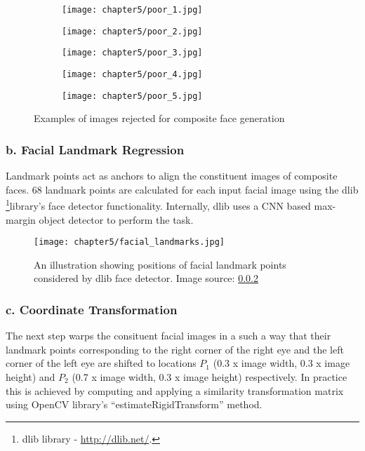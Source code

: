 \documentclass[../report.tex]{subfiles}
\begin{document}
       \begin{figure}[H]\label{fig_gmdb_poor}
    	   	\centering
    	   	\begin{subfigure}[b]{0.17\textwidth}
    		   		\centering
    		   		\texttt{[image: chapter5/poor\_1.jpg]}
    		   	\end{subfigure}
    	   	\begin{subfigure}[b]{0.17\textwidth}
    		   		\centering
    		   		\texttt{[image: chapter5/poor\_2.jpg]}
    		   	\end{subfigure}
    	   		\begin{subfigure}[b]{0.17\textwidth}
    	   		\centering
    	   		\texttt{[image: chapter5/poor\_3.jpg]}
    	   	\end{subfigure}
       		\begin{subfigure}[b]{0.17\textwidth}
       			\centering
       			\texttt{[image: chapter5/poor\_4.jpg]}
       		\end{subfigure}
       			\begin{subfigure}[b]{0.17\textwidth}
       			\centering
       			\texttt{[image: chapter5/poor\_5.jpg]}
       		\end{subfigure}
    	   	\caption{Examples of images rejected for composite face generation}
    	   \end{figure}
    \subsubsection{b. Facial Landmark Regression}
    Landmark points act as anchors to align the constituent images of composite faces. 68 landmark points are calculated for each input facial image using the dlib \footnote{dlib library - \url{http://dlib.net/}.}library's face detector functionality. Internally, dlib uses a CNN based max-margin object detector to perform the task.
        \begin{figure}[H]
        \centering
    	\hspace*{0cm}      
    	\texttt{[image: chapter5/facial\_landmarks.jpg]}
    	\caption{An illustration showing positions of facial landmark points considered by dlib face detector. Image source: \ref{}}
    	\label{fig_gm_pipeline}
    \end{figure}
    \subsubsection{c. Coordinate Transformation}
    The next step warps the consituent facial images in a such a way that their landmark points corresponding to the right corner of the right eye and the left corner of the left eye are shifted to locations $P_{1}$ (0.3 x image width, 0.3 x image height) and $P_{2}$ (0.7 x image width, 0.3 x image height) respectively. In practice this is achieved by computing and applying a similarity transformation matrix using OpenCV library's \enquote{estimateRigidTransform} method.
    
\end{document}

